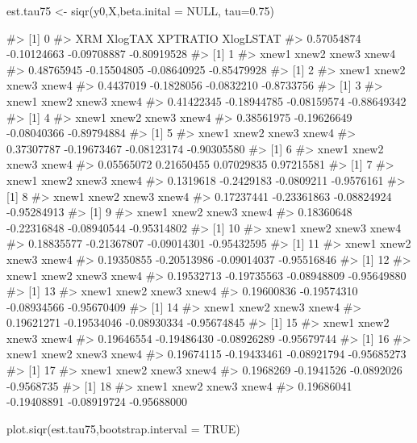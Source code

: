 \begin{Schunk}
\begin{Sinput}
est.tau75 <- siqr(y0,X,beta.inital = NULL, tau=0.75)
\end{Sinput}
\begin{Soutput}
#> [1] 0
#>         XRM     XlogTAX    XPTRATIO   XlogLSTAT 
#>  0.57054874 -0.10124663 -0.09708887 -0.80919528 
#> [1] 1
#>       xnew1       xnew2       xnew3       xnew4 
#>  0.48765945 -0.15504805 -0.08640925 -0.85479928 
#> [1] 2
#>      xnew1      xnew2      xnew3      xnew4 
#>  0.4437019 -0.1828056 -0.0832210 -0.8733756 
#> [1] 3
#>       xnew1       xnew2       xnew3       xnew4 
#>  0.41422345 -0.18944785 -0.08159574 -0.88649342 
#> [1] 4
#>       xnew1       xnew2       xnew3       xnew4 
#>  0.38561975 -0.19626649 -0.08040366 -0.89794884 
#> [1] 5
#>       xnew1       xnew2       xnew3       xnew4 
#>  0.37307787 -0.19673467 -0.08123174 -0.90305580 
#> [1] 6
#>      xnew1      xnew2      xnew3      xnew4 
#> 0.05565072 0.21650455 0.07029835 0.97215581 
#> [1] 7
#>      xnew1      xnew2      xnew3      xnew4 
#>  0.1319618 -0.2429183 -0.0809211 -0.9576161 
#> [1] 8
#>       xnew1       xnew2       xnew3       xnew4 
#>  0.17237441 -0.23361863 -0.08824924 -0.95284913 
#> [1] 9
#>       xnew1       xnew2       xnew3       xnew4 
#>  0.18360648 -0.22316848 -0.08940544 -0.95314802 
#> [1] 10
#>       xnew1       xnew2       xnew3       xnew4 
#>  0.18835577 -0.21367807 -0.09014301 -0.95432595 
#> [1] 11
#>       xnew1       xnew2       xnew3       xnew4 
#>  0.19350855 -0.20513986 -0.09014037 -0.95516846 
#> [1] 12
#>       xnew1       xnew2       xnew3       xnew4 
#>  0.19532713 -0.19735563 -0.08948809 -0.95649880 
#> [1] 13
#>       xnew1       xnew2       xnew3       xnew4 
#>  0.19600836 -0.19574310 -0.08934566 -0.95670409 
#> [1] 14
#>       xnew1       xnew2       xnew3       xnew4 
#>  0.19621271 -0.19534046 -0.08930334 -0.95674845 
#> [1] 15
#>       xnew1       xnew2       xnew3       xnew4 
#>  0.19646554 -0.19486430 -0.08926289 -0.95679744 
#> [1] 16
#>       xnew1       xnew2       xnew3       xnew4 
#>  0.19674115 -0.19433461 -0.08921794 -0.95685273 
#> [1] 17
#>      xnew1      xnew2      xnew3      xnew4 
#>  0.1968269 -0.1941526 -0.0892026 -0.9568735 
#> [1] 18
#>       xnew1       xnew2       xnew3       xnew4 
#>  0.19686041 -0.19408891 -0.08919724 -0.95688000
\end{Soutput}
\begin{Sinput}
plot.siqr(est.tau75,bootstrap.interval = TRUE)
\end{Sinput}


\end{Schunk}
